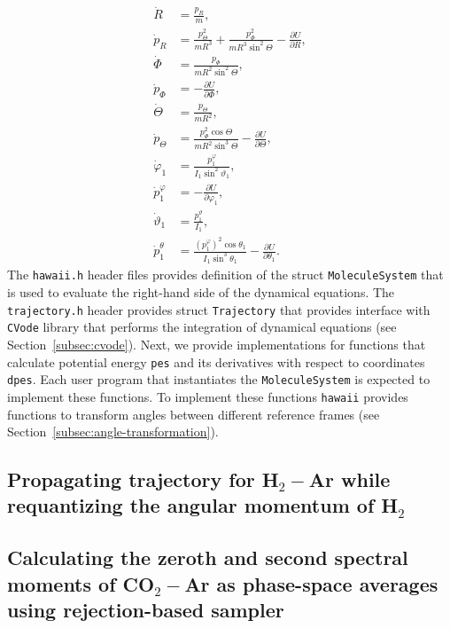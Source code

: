 \documentclass{article}
\newcommand{\lb}{\left(}
\newcommand{\rb}{\right)}
\begin{document}
\begin{align*}
    \dot{R} &= \frac{p_R}{m}, \\
    \dot{p}_R &= \frac{p_\Theta^2}{m R^3} + \frac{p_\Phi^2}{m R^3 \sin^2 \Theta} - \frac{\partial U}{\partial R}, \\
    \dot{\Phi} &= \frac{p_\Phi}{m R^2 \sin^2 \Theta}, \\
    \dot{p}_\Phi &= -\frac{\partial U}{\partial \Phi}, \\
    \dot{\Theta} &= \frac{p_\Theta}{m R^2}, \\
    \dot{p}_\Theta &= \frac{p_\Phi^2 \cos \Theta}{m R^2 \sin^3 \Theta} - \frac{\partial U}{\partial \Theta}, \\
    \dot{\varphi}_1 &= \frac{\displaystyle p_1^{\varphi}}{I_1 \sin^2 \vartheta_1}, \\
    \dot{p}_1^{\varphi} &= -\frac{\partial U}{\partial \varphi_1}, \\
    \dot{\vartheta}_1 &= \frac{p_1^\vartheta}{I_1}, \\ 
    \dot{p}_1^{\theta} &= \frac{\displaystyle \lb p_1^\varphi \rb^2 \cos \theta_1}{I_1 \sin^3 \theta_1} - \frac{\partial U}{\partial \theta_1}.
\end{align*}
%
The \texttt{hawaii.h} header files provides definition of the struct \texttt{MoleculeSystem} that is used to evaluate the right-hand side of the dynamical equations. The \texttt{trajectory.h} header provides struct \texttt{Trajectory} that provides interface with \texttt{CVode} library that performs the integration of dynamical equations (see Section~\ref{subsec:cvode}).
Next, we provide implementations for functions that calculate potential energy \texttt{pes} and its derivatives with respect to coordinates \texttt{dpes}. Each user program that instantiates the \texttt{MoleculeSystem} is expected to implement these functions. To implement these functions \texttt{hawaii} provides functions to transform angles between different reference frames (see Section~\ref{subsec:angle-transformation}).      


\subsection{Propagating trajectory for H$_2-$Ar while requantizing the angular momentum of H$_2$}
\label{subsec:example-req-trajectory}

\subsection{Calculating the zeroth and second spectral moments of CO$_2-$Ar as phase-space averages using rejection-based sampler}
\label{subsec:example-spmoments-co2-ar}
\end{document}
